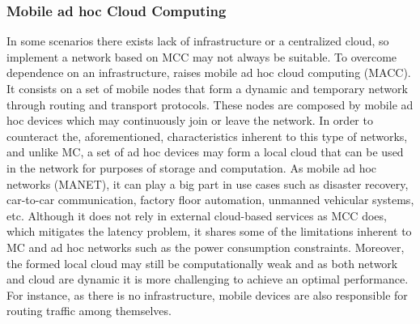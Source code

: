 \subsubsection{Mobile ad hoc Cloud Computing}
In some scenarios there exists lack of infrastructure or a centralized cloud, so implement a network based on MCC may not always be suitable. To overcome dependence on an infrastructure, raises mobile ad hoc cloud computing (MACC). It consists on a set of mobile nodes that form a dynamic and temporary network through routing and transport protocols. These nodes are composed by mobile ad hoc devices which may continuously join or leave the network. In order to counteract the, aforementioned, characteristics inherent to this type of networks, and unlike MC, a set of ad hoc devices may form a local cloud that can be used in the network for purposes of storage and computation. As mobile ad hoc networks (MANET), it can play a big part in use cases such as disaster recovery, car-to-car communication, factory floor automation, unmanned vehicular systems, etc. Although it does not rely in external cloud-based services as MCC does, which mitigates the latency problem, it shares some of the limitations inherent to MC and ad hoc networks such as the power consumption constraints. Moreover, the formed local cloud may still be computationally weak and as both network and cloud are dynamic it is more challenging to achieve an optimal performance. For instance, as there is no infrastructure, mobile devices are also responsible for routing traffic among themselves.

